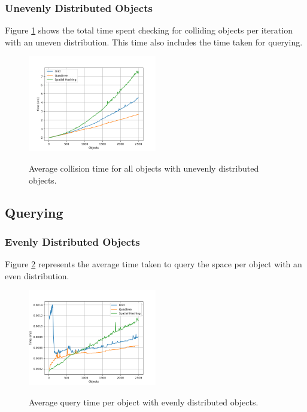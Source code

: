 \documentclass[a4paper, 12pt]{article}
\begin{document}
\subsubsection{Unevenly Distributed Objects}
Figure \ref{fig:uneven-collision} shows the total time spent checking for
colliding objects per iteration with an uneven distribution. This time also
includes the time taken for querying.
\begin{figure}[h]
    \centering
    \caption{Average collision time for all objects with unevenly distributed
    objects.}
    \includegraphics[width=0.5\textwidth]{uneven-collision.png}
    \label{fig:uneven-collision}
\end{figure}

\subsection{Querying}

\subsubsection{Evenly Distributed Objects}
Figure \ref{fig:even-query} represents the average time taken to query the space
per object with an even distribution.
\begin{figure}[h]
    \centering
    \caption{Average query time per object with evenly distributed objects.}
    \includegraphics[width=0.5\textwidth]{even-query.png}
    \label{fig:even-query}
\end{figure}
\end{document}
